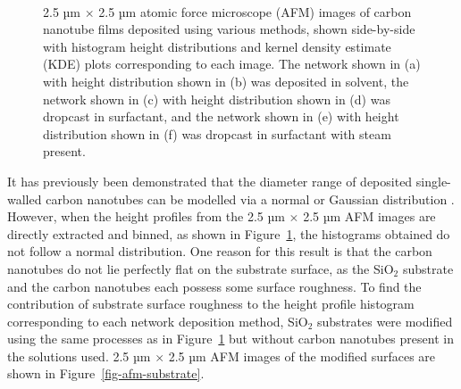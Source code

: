 \documentclass[
  a4paper,
]{scrbook}
\begin{document}
\begin{figure}
\begin{minipage}[t]{0.45\linewidth}
{{}

}

\end{minipage}%
%
\begin{minipage}[t]{0.01\linewidth}

{\centering 

~

}

\end{minipage}%

\caption{\label{fig-afm-morphology}2.5 µm \(\times\) 2.5 µm atomic force
microscope (AFM) images of carbon nanotube films deposited using various
methods, shown side-by-side with histogram height distributions and
kernel density estimate (KDE) plots corresponding to each image. The
network shown in (a) with height distribution shown in (b) was deposited
in solvent, the network shown in (c) with height distribution shown in
(d) was dropcast in surfactant, and the network shown in (e) with height
distribution shown in (f) was dropcast in surfactant with steam
present.}

\end{figure}

It has previously been demonstrated that the diameter range of deposited
single-walled carbon nanotubes can be modelled via a normal or Gaussian
distribution \autocite{LeMieux2008,Liu2013,Vobornik2023}. However, when
the height profiles from the 2.5 µm \(\times\) 2.5 µm AFM images are
directly extracted and binned, as shown in
Figure~\ref{fig-afm-morphology}, the histograms obtained do not follow a
normal distribution. One reason for this result is that the carbon
nanotubes do not lie perfectly flat on the substrate surface, as the
SiO\(_2\) substrate and the carbon nanotubes each possess some surface
roughness. To find the contribution of substrate surface roughness to
the height profile histogram corresponding to each network deposition
method, SiO\(_2\) substrates were modified using the same processes as
in Figure~\ref{fig-afm-morphology} but without carbon nanotubes present
in the solutions used. 2.5 µm \(\times\) 2.5 µm AFM images of the
modified surfaces are shown in Figure~\ref{fig-afm-substrate}.
\end{document}
